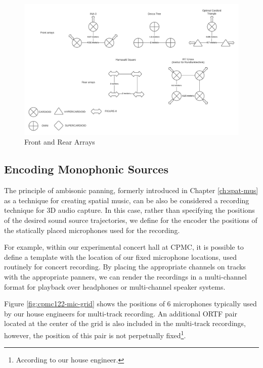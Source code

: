 \begin{figure}[ht!]%
\centering
\includegraphics[width=1.0\textwidth]{img/front-n-rear-arrays.pdf} 

\caption{Front and Rear Arrays}
\label{fig:fnr-arrays}
\end{figure}

\subsection{Encoding Monophonic Sources}


The principle of ambisonic panning, formerly introduced in Chapter \ref{ch:spat-mus} as a technique for creating spatial music, can be also be considered a recording technique for 3D audio capture. In this case, rather than specifying the positions of the desired sound source trajectories, we define for the encoder the positions of the statically placed microphones used for the recording. 

For example, within our experimental concert hall at CPMC, it is possible to define a template with the location of our fixed microphone locations, used routinely for concert recording. By placing the appropriate channels on tracks with the appropriate panners, we can render the recordings in a multi-channel format for playback over headphones or multi-channel speaker systems. 

Figure \ref{fig:cpmc122-mic-grid} shows the positions of 6 microphones typically used by our house engineers for multi-track recording. An additional ORTF pair located at the center of the grid is also included in the multi-track recordings, however, the position of this pair is not perpetually fixed\footnote{According to our house engineer.}. 

